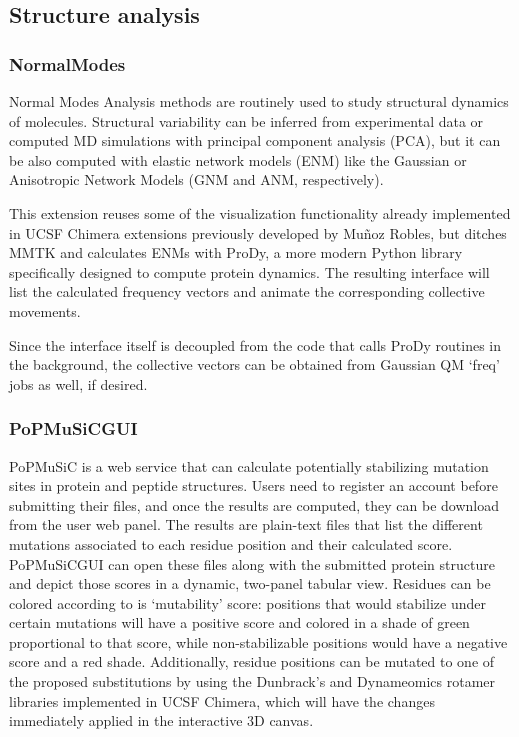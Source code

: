 \subsection{Structure analysis}
\subsubsection{NormalModes}
Normal Modes Analysis methods are routinely used to study structural dynamics of molecules. Structural variability can be inferred from experimental data or computed MD simulations with principal component analysis (PCA), but it can be also computed with elastic network models (ENM) like the Gaussian or Anisotropic Network Models (GNM and ANM, respectively).

This extension reuses some of the visualization functionality already implemented in UCSF Chimera extensions previously developed by Muñoz Robles,\cite{MunozRobles2014a} but ditches MMTK\cite{mmtk} and calculates ENMs with ProDy,\cite{prody} a more modern Python library specifically designed to compute protein dynamics. The resulting interface will list the calculated frequency vectors and animate the corresponding collective movements.

Since the interface itself is decoupled from the code that calls ProDy routines in the background, the collective vectors can be obtained from Gaussian QM ‘freq’ jobs as well, if desired.

\subsubsection{PoPMuSiCGUI}
PoPMuSiC\cite{dehouck2011popmusic} is a web service that can calculate potentially stabilizing mutation sites in protein and peptide structures. Users need to register an account before submitting their files, and once the results are computed, they can be download from the user web panel. The results are plain-text files that list the different mutations associated to each residue position and their calculated score. PoPMuSiCGUI can open these files along with the submitted protein structure and depict those scores in a dynamic, two-panel tabular view. Residues can be colored according to is ‘mutability’ score: positions that would stabilize under certain mutations will have a positive score and colored in a shade of green proportional to that score, while non-stabilizable positions would have a negative score and a red shade. Additionally, residue positions can be mutated to one of the proposed substitutions by using the Dunbrack's\cite{dunbrack1993backbone} and Dynameomics\cite{scouras2011dynameomics} rotamer libraries implemented in UCSF Chimera, which will have the changes immediately applied in the interactive 3D canvas.



